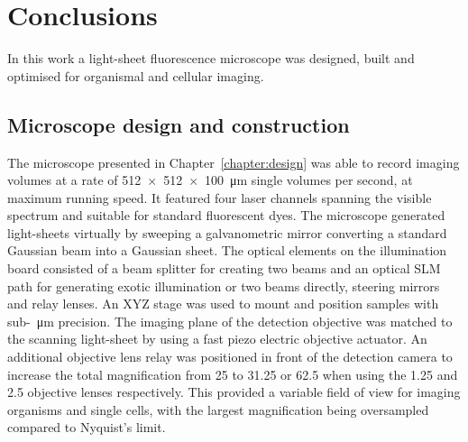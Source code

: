 \ifpdf{}
    \graphicspath{{Chapters/conclusions/Figs/Raster/}{Chapters/conclusions/Figs/PDF/}{Chapters/conclusions/Figs/}}
\else
    \graphicspath{{Chapters/conclusions/Figs/Vector/}{Chapters/conclusions/Figs/}}
\fi

\chapter{Conclusions}\label{chapter:conclusions} %

In this work a \gls{light-sheet} fluorescence microscope was designed, built and optimised for organismal and cellular imaging.

\section{Microscope design and construction}

The microscope presented in Chapter~\ref{chapter:design} was able to record imaging volumes at a rate of \SI{512x512x100}{\micro\meter} single volumes per second, at maximum running speed.
It featured four laser channels spanning the visible spectrum and suitable for standard fluorescent dyes.
The microscope generated light-sheets virtually by sweeping a galvanometric mirror converting a standard Gaussian beam into a Gaussian sheet.
The optical elements on the \gls{illumination board} consisted of a beam splitter for creating two beams and an optical \gls{SLM} path for generating exotic illumination or two beams directly, steering mirrors and relay lenses.
An XYZ stage was used to mount and position samples with sub-\SI{}{\micro\meter} precision.
The imaging plane of the  detection objective was matched to the scanning light-sheet by using a fast piezo electric objective actuator.
An additional objective lens relay was positioned in front of the detection camera to increase the total magnification from \SI{25}{\times} to \SI{31.25}{\times} or \SI{62.5}{\times} when using the \SI{1.25}{\times} and \SI{2.5}{\times} objective lenses respectively.
This provided a variable field of view for imaging organisms and single cells, with the largest magnification being oversampled compared to Nyquist's limit.

